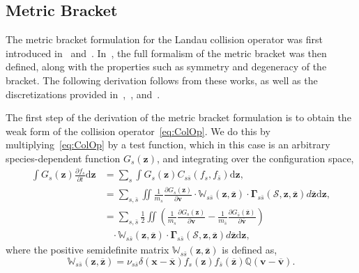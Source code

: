\documentclass[preprint,12pt]{elsarticle}
\theoremstyle{definition}
\begin{document}
\subsection{Metric Bracket}\label{sec:MetricBracket}

The metric bracket formulation for the Landau collision operator was first introduced in~\cite{Morrison1984} and~\cite{Kaufman1984}. In~\cite{Morrison1986}, the full formalism of the metric bracket was then defined, along with the properties such as symmetry and degeneracy of the bracket. The following derivation follows from these works, as well as the discretizations provided in~\cite{Kraus2017},~\cite{Carrillo2020}, and~\cite{Eero2020}. 

The first step of the derivation of the metric bracket formulation is to obtain the weak form of the collision operator~\eqref{eq:ColOp}. We do this by multiplying~\eqref{eq:ColOp} by a test function, which in this case is an arbitrary species-dependent function $G_s (\boldsymbol{z})$, and integrating over the configuration space,
\begin{align}
\int G_s (\boldsymbol{z}) \frac{\partial f_s}{\partial t} \mathrm{d} \boldsymbol{z} &= \sum_{s} \int G_s (\boldsymbol{z}) C_{s \overline{s}}(f_s, f_{\bar{s}}) \mathrm{d} \boldsymbol{z}, \nonumber\\
&=\sum_{s, \bar{s}} \iint \frac{1}{m_{s}} \frac{\partial G_{s}(\boldsymbol{z})}{\partial \boldsymbol{v}} \cdot \mathbb{W}_{s \bar{s}}(\boldsymbol{z}, \overline{\boldsymbol{z}}) \cdot \boldsymbol{\Gamma}_{s \bar{s}}(\mathcal{S}, \boldsymbol{z}, \overline{\boldsymbol{z}}) d \overline{\boldsymbol{z}} \mathrm{d} \boldsymbol{z}, \nonumber \\
&=\sum_{s, \bar{s}} \frac{1}{2} \iint\left(\frac{1}{m_{s}} \frac{\partial G_s (\boldsymbol{z})}{\partial \boldsymbol{v}}-\frac{1}{m_{\bar{s}}} \frac{\partial G_{\bar{s}}(\overline{\boldsymbol{z}})}{\partial \overline{\boldsymbol{v}}}\right)  \label{WeakForm}\\
&\;\;\;\cdot \mathbb{W}_{s \bar{s}}(\boldsymbol{z}, \overline{\boldsymbol{z}}) \cdot \boldsymbol{\Gamma}_{s \bar{s}}(\mathcal{S}, \boldsymbol{z}, \overline{\boldsymbol{z}}) d \overline{\boldsymbol{z}} \mathrm{d} \boldsymbol{z},\nonumber
\end{align}
where the positive semidefinite matrix $\mathbb{W}_{s \bar{s}}(\boldsymbol{z}, \overline{\boldsymbol{z}})$ is defined as,
\begin{equation}
  \mathbb{W}_{s \bar{s}}(\boldsymbol{z}, \overline{\boldsymbol{z}}) = \nu_{s \bar{s}} \delta(\boldsymbol{x}-\overline{\boldsymbol{x}}) f_{s}(\boldsymbol{z}) f_{\bar{s}}(\overline{\boldsymbol{z}}) \mathbb{Q}(\boldsymbol{v}-\overline{\boldsymbol{v}}).
  \label{Wmat}
\end{equation}
\end{document}
